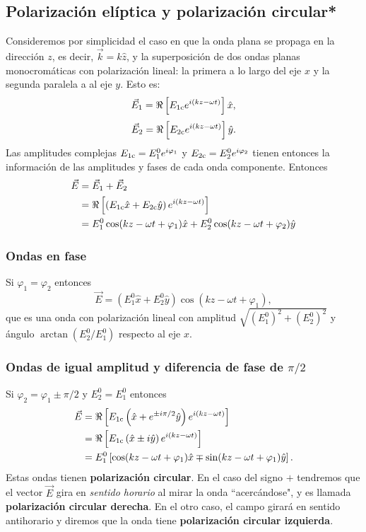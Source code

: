 \subsection{Polarización elíptica y polarización circular*}
Consideremos por simplicidad el caso en que la onda plana se propaga en la dirección $z$, es decir, $\vec{k}=k\hat{z}$, y la superposición de dos ondas planas monocromáticas con polarización lineal: la primera a lo largo del eje $x$ y la segunda paralela a al eje $y$. Esto es:
\begin{equation}
\vec{E}_1=\Re\left[E_{1\rm c} e^{i(kz-\omega t)}\right]\hat{x},
\end{equation}
\begin{equation}
\vec{E}_2=\Re\left[E_{2\rm c} e^{i(kz-\omega t)}\right]\hat{y}.
\end{equation}
Las amplitudes complejas $E_{1\rm c}=E_{1}^0e^{i\varphi_1}$ y $E_{2\rm c}=E_{2}^0e^{i\varphi_2}$ tienen entonces la información de las amplitudes y fases de cada onda componente. Entonces
\begin{align}
\vec{E} &= \vec{E}_1+\vec{E}_2 \\
&= \Re\left[\left(E_{1\rm c}\hat{x}+E_{2\rm c}\hat{y}\right) e^{i(kz-\omega t)}\right] \label{E12-2} \\
&= E_{1}^0\cos(kz-\omega t+\varphi_1)\hat{x} + E_{2}^0\cos(kz-\omega t+\varphi_2)\hat{y}
\end{align}

\subsubsection{Ondas en fase}
 Si $\varphi_1=\varphi_2$ entonces
\begin{equation}
\vec{E} = (E_{1}^0\hat{x}+E_{2}^0\hat{y})\cos(kz-\omega t+\varphi_1),
\end{equation}
que es una onda con polarización lineal con amplitud $\sqrt{(E_{1}^0)^2+(E_{2}^0)^2}$ y ángulo $\arctan(E_{2}^0/E_{1}^0)$ respecto al eje $x$.

\subsubsection{Ondas de igual amplitud y diferencia de fase de $\pi/2$}
 Si $\varphi_2=\varphi_1\pm\pi/2$ y $E_{2}^0=E_{1}^0$ entonces
\begin{align}
\vec{E} &= \Re\left[E_{1\rm c}\left(\hat{x}+ e^{\pm i\pi/2}\hat{y}\right) e^{i(kz-\omega t)}\right] \\
&= \Re\left[E_{1\rm c}\left(\hat{x}\pm i\hat{y}\right) e^{i(kz-\omega t)}\right]\\
&= E_{1}^0\left[\cos(kz-\omega t+\varphi_1)\hat{x} \mp \sin(kz-\omega t+\varphi_1)\hat{y}\right].
\end{align}
Estas ondas tienen \textbf{polarización circular}. En el caso del signo $+$ tendremos que el vector $\vec{E}$ gira en \textit{sentido horario} al mirar la onda ``acercándose", y es llamada \textbf{polarización circular derecha}. En el otro caso, el campo girará en sentido antihorario y diremos que la onda tiene \textbf{polarización circular izquierda}.

